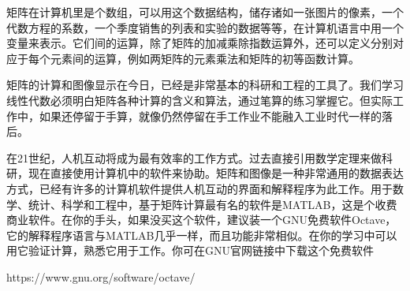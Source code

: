 矩阵在计算机里是个数组，可以用这个数据结构，储存诸如一张图片的像素，一个代数方程的系数，一个季度销售的列表和实验的数据等等，在计算机语言中用一个变量来表示。它们间的运算，除了矩阵的加减乘除指数运算外，还可以定义分别对应于每个元素间的运算，例如两矩阵的元素乘法和矩阵的初等函数计算。

矩阵的计算和图像显示在今日，已经是非常基本的科研和工程的工具了。我们学习线性代数必须明白矩阵各种计算的含义和算法，通过笔算的练习掌握它。但实际工作中，如果还停留于手算，就像仍然停留在手工作业不能融入工业时代一样的落后。

在21世纪，人机互动将成为最有效率的工作方式。过去直接引用数学定理来做科研，现在直接使用计算机中的软件来协助。矩阵和图像是一种非常通用的数据表达方式，已经有许多的计算机软件提供人机互动的界面和解释程序为此工作。用于数学、统计、科学和工程中，基于矩阵计算最有名的软件是MATLAB，这是个收费商业软件。在你的手头，如果没买这个软件，建议装一个GNU免费软件Octave，它的解释程序语言与MATLAB几乎一样，而且功能非常相似。在你的学习中可以用它验证计算，熟悉它用于工作。你可在GNU官网链接中下载这个免费软件

https://www.gnu.org/software/octave/

